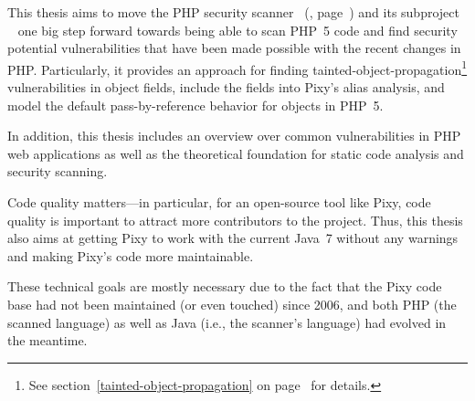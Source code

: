 This thesis aims to move the PHP security scanner ~(\cite{pixy}, page~\pageref{pixy}) and its subproject ~\cite{phpparser} one big step forward towards being able to scan PHP~5 code and find security potential vulnerabilities that have been made possible with the recent changes in PHP. Particularly, it provides an approach for finding tainted-object-propagation\footnote{See section~\ref{tainted-object-propagation} on page~\pageref{tainted-object-propagation} for details.} vulnerabilities in object fields, include the fields into Pixy's alias analysis, and model the default pass-by-reference behavior for objects in PHP~5.

In addition, this thesis includes an overview over common vulnerabilities in PHP web applications as well as the theoretical foundation for static code analysis and security scanning.

Code quality matters---in particular, for an open-source tool like Pixy, code quality is important to attract more contributors to the project. Thus, this thesis also aims at getting Pixy to work with the current Java~7 without any warnings and making Pixy's code more maintainable.

These technical goals are mostly necessary due to the fact that the Pixy code base had not been maintained (or even touched) since 2006, and both PHP (\ie the scanned language) as well as Java (i.e., the scanner's language) had evolved in the meantime.
